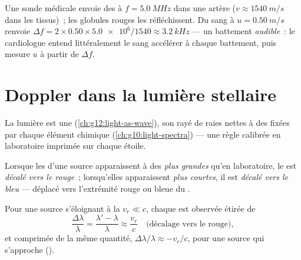 \begin{example}\label{ex:g12:doppler-effect:ultrasound}
Une sonde médicale envoie des  à
$f = \qty{5.0}{MHz}$ dans une artère ($v \approx \qty{1540}{m/s}$
dans les tissus)~; les globules rouges les réfléchissent. Du sang à
$u = \qty{0.50}{m/s}$ renvoie
$\Delta f = 2 \times 0.50 \times \num{5.0e6}/1540 \approx
\qty{3.2}{kHz}$ --- un battement \emph{audible}~: le cardiologue
entend littéralement le sang accélérer à chaque battement, puis
mesure $u$ à partir de $\Delta f$.
\end{example}

\section{Doppler dans la lumière stellaire}

La lumière est une  (\cref{ch:g12:light-as-wave}), son
 rayé de raies nettes à des
 fixées par chaque élément chimique
(\cref{ch:g10:light-spectra}) --- une règle calibrée en laboratoire
imprimée sur chaque étoile.

\begin{definition}\label{def:g12:doppler-effect:redshift}
Lorsque les  d'une source apparaissent à des
 \emph{plus grandes} qu'en laboratoire, le
 est \emph{décalé vers le rouge}~; lorsqu'elles apparaissent \emph{plus courtes}, il est
\emph{décalé vers le bleu} --- déplacé
vers l'extrémité rouge ou bleue du .
\end{definition}

\begin{proposition}\label{prop:g12:doppler-effect:light}
Pour une source s'éloignant à la  $v_r \ll c$, chaque
 est observée étirée de
\[ \frac{\Delta \lambda}{\lambda} = \frac{\lambda' - \lambda}{\lambda} \approx \frac{v_r}{c} \quad \text{(décalage vers le rouge)}, \]
et comprimée de la même quantité, $\Delta\lambda/\lambda \approx -v_r/c$,
pour une source qui s'approche ().
\end{proposition}
\admitted

